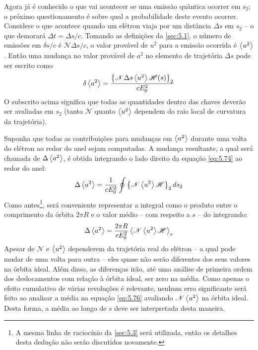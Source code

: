 Agora já é conhecido o que vai acontecer se uma emissão quântica ocorrer em $s_2$; o próximo questionamento é sobre qual a probabilidade deste evento ocorrer. Considere o que acontece quando um elétron viaja por um distância $\Delta s$ em $s_2$ -- o que demorará $\Delta t = \Delta s/c$. Tomando as definições da \autoref{sec:5.1}, o número de emissões em $\delta s/c$ é $\mathscr{N} \Delta s/c$, o valor provável de $u^2$ para a emissão ocorrida é $\left< u^2 \right>$. Então uma mudança no valor provável de $a^2$ no elemento de trajetória $\Delta s$ pode ser escrito como
\begin{align}
	\delta \left< a^2 \right> = \frac{\left\{\mathscr{N} \Delta s \left< u^2 \right>\mathscr{H}(s)\right\}_2}{c E_0^2}\label{eq:5.74}
\end{align}
O subscrito acima significa que todas as quantidades dentro das chaves deverão ser avaliadas em $s_2$ (tanto $\mathscr{N}$ quanto $\left< u^2 \right>$ dependem do raio local de curvatura da trajetória).

Suponha que todas as contribuições para mudanças em $\left< a^2 \right>$ durante uma volta do elétron ao redor do anel sejam computadas. A mudança resultante, a qual será chamada de $\Delta \left< a^2 \right>$, é obtida integrando o lado direito da equação \eqref{eq:5.74} ao redor do anel:
\begin{align}
	\Delta \left< a^2 \right> = \frac{1}{c E_0^2} \oint \left\{\mathscr{N} \left< u^2 \right> \mathscr{H}\right\}_2 ds_2
\end{align}
Como antes\footnote{A mesma linha de raciocínio da \autoref{sec:5.3} será utilizada, então os detalhes desta dedução não serão discutidos novamente.}, será conveniente representar a integral como o produto entre o comprimento da órbita $2\pi R$ e o valor médio -- com respeito a $s$ -- do integrando:
\begin{align}
	\Delta \left< a^2 \right> = \frac{2 \pi R}{c E_0^2}\left< \mathscr{N} \left< u^2 \right> \mathscr{H} \right>_s\label{eq:5.76}
\end{align}
Apesar de $\mathscr{N}$ e $\left< u^2 \right>$ dependerem da trajetória real do elétron -- a qual pode mudar de uma volta para outra -- eles quase não serão diferentes dos seus valores na órbita ideal. Além disso, as diferenças irão, até uma análise de primeira ordem dos deslocamentos com relação à órbita ideal, ser zero na média. Como apenas o efeito cumulativo de várias revoluções é relevante, nenhum erro significante será feito ao analisar a média na equação \eqref{eq:5.76} avaliando $\mathscr{N}\left< u^2 \right>$ na órbita ideal. Desta forma, a média ao longo de $s$ deve ser interpretada desta maneira.

